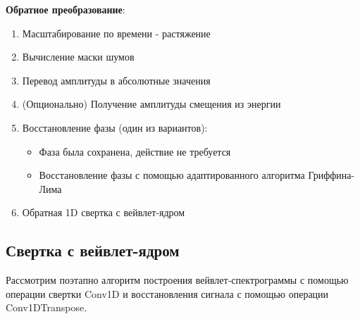 \textbf{Обратное преобразование}:
\begin{enumerate}[1.]
  \item Масштабирование по времени - растяжение
  \item Вычисление маски шумов
  \item Перевод амплитуды в абсолютные значения
  \item (Опционально) Получение амплитуды смещения из энергии
  \item Восстановление фазы (один из вариантов):
    \begin{itemize}
      \item Фаза была сохранена, действие не требуется
      \item Восстановление фазы с помощью адаптированного алгоритма Гриффина-Лима
    \end{itemize}
  \item Обратная 1D свертка с вейвлет-ядром
\end{enumerate}


\subsection{Свертка с вейвлет-ядром}

Рассмотрим поэтапно алгоритм построения вейвлет-спектрограммы с помощью операции свертки Conv1D и восстановления сигнала с помощью
операции Conv1DTranspose.


